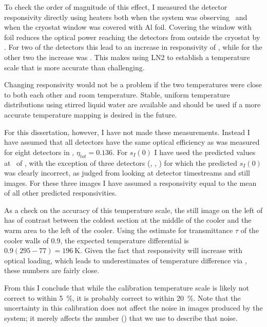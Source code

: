 To check the order of magnitude of this effect, I measured the detector responsivity directly using heaters both when the system was observing \ecco\ and when the cryostat window was covered with Al foil.
Covering the window with foil reduces the optical power reaching the detectors from outside the cryostat by .
For two of the detectors this lead to an increase in responsivity of , while for the other two the increase was .
This makes using LN2 to establish a temperature scale that is more accurate than  challenging.

Changing responsivity would not be a problem if the two temperatures were close to both each other and room temperature.
Stable, uniform temperature distributions using stirred liquid water are available \cite{dietlein_aqueous_2008} and should be used if a more accurate temperature mapping is desired in the future.

For this dissertation, however, I have not made these measurements.
Instead I have assumed that all detectors have the same optical efficiency as was measured for eight detectors in , $\eta_{tot} = 0.136$.
For $s_I(0)$ I have used the predicted values at \SOC\ of , with the exception of three detectors (, , ) for which the predicted $s_I(0)$ was clearly incorrect, as judged from looking at detector timestreams and still images.
For these three images I have assumed a responsivity equal to the mean of all other predicted responsivities.

As a check on the accuracy of this temperature scale, the still image on the left of  has  of contrast between the coldest section at the middle of the cooler and the warm area to the left of the cooler.
Using the estimate for transmittance $\tau$ of the cooler walls of \num{0.9}, the expected temperature differential is $0.9(295-77) = \SI{196}{\K}$.
Given the fact that responsivity will increase with optical loading, which leads to underestimates of temperature difference via , these numbers are fairly close.

From this I conclude that while the calibration temperature scale is likely not correct to within \SI{5}{\percent}, it is probably correct to within \SI{20}{\percent}.
Note that the uncertainty in this calibration does not affect the noise in images produced by the system; it merely affects the number (\NETD) that we use to describe that noise.

